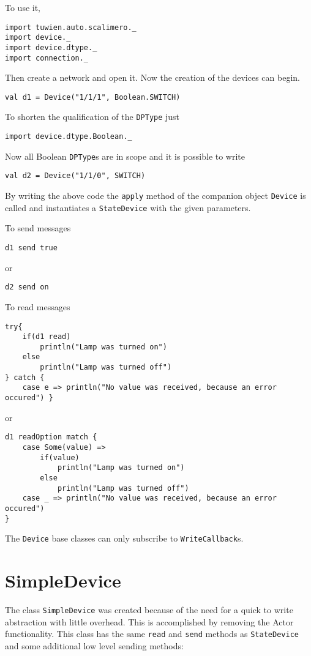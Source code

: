 To use it,
\begin{lstlisting}
import tuwien.auto.scalimero._
import device._
import device.dtype._
import connection._
\end{lstlisting}
Then create a network and open it. Now the creation of the devices can begin.
\begin{lstlisting}
val d1 = Device("1/1/1", Boolean.SWITCH)
\end{lstlisting}
To shorten the qualification of the \lstinline!DPType! just
\begin{lstlisting}
import device.dtype.Boolean._
\end{lstlisting}
 Now all Boolean \lstinline!DPType!s are in scope and it is possible to write
\begin{lstlisting}
val d2 = Device("1/1/0", SWITCH)
\end{lstlisting}
By writing the above code the \lstinline!apply! method of the companion object \lstinline!Device! is called and instantiates a \lstinline!StateDevice! with the given parameters.

To send messages
\begin{lstlisting}
d1 send true
\end{lstlisting}
or
\begin{lstlisting}
d2 send on
\end{lstlisting}
To read messages
\begin{lstlisting}
try{
    if(d1 read)
        println("Lamp was turned on")
    else
        println("Lamp was turned off")
} catch {
    case e => println("No value was received, because an error occured") }
\end{lstlisting}
or
\begin{lstlisting}
d1 readOption match {
    case Some(value) =>
        if(value)
            println("Lamp was turned on")
        else
            println("Lamp was turned off")
    case _ => println("No value was received, because an error occured")
}
\end{lstlisting}
The \lstinline!Device! base classes can only subscribe to \lstinline!WriteCallback!s.
\section{SimpleDevice}

The class \lstinline!SimpleDevice! was created because of the need for a quick to write abstraction with little overhead. This is accomplished by removing the Actor functionality. This class has the same \lstinline!read! and \lstinline!send! methods as \lstinline!StateDevice! and some additional low level sending methods:

